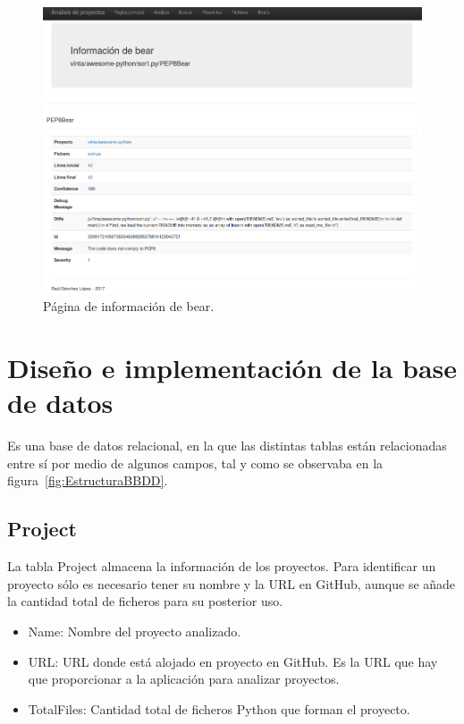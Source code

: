 \documentclass[a4paper, 12pt]{book}
\begin{document}
\begin{figure}[H]
  \centering
  \includegraphics[width=12cm, keepaspectratio]{img/infoBear}
  \caption{Página de información de bear.}
  \label{fig:infoBear}
\end{figure}

\section{Diseño e implementación de la base de datos} 
\label{sec:seccion14}
Es una base de datos relacional, en la que las distintas tablas están relacionadas entre sí por medio de algunos campos, tal y como se observaba en la figura~\ref{fig:EstructuraBBDD}.

\subsection{Project}
\label{sec:seccion14.1}
La tabla Project almacena la información de los proyectos. Para identificar un proyecto sólo es necesario tener su nombre y la URL en GitHub, aunque se añade la cantidad total de ficheros para su posterior uso.

\begin{itemize}
          \item Name: Nombre del proyecto analizado.
          \item URL: URL donde está alojado en proyecto en GitHub. Es la URL que hay que proporcionar a la aplicación para analizar proyectos.
          \item TotalFiles: Cantidad total de ficheros Python que forman el proyecto.
\end{itemize}
\end{document}
